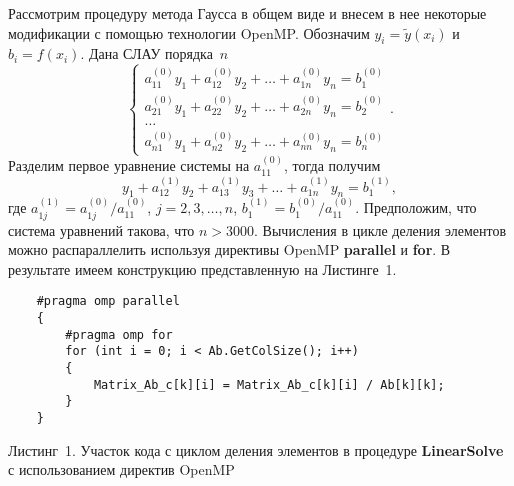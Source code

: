 \documentclass{spisok-article}
\begin{document}
Рассмотрим процедуру метода Гаусса в общем виде и внесем в нее некоторые модификации с помощью технологии OpenMP. Обозначим $y_i=\tilde y\left(x_i\right)$ и $b_i=f\left(x_i\right)$. Дана СЛАУ порядка~$n$
$$
	\begin{cases}
		a_{11}^{\left(0\right)}y_1+a_{12}^{\left(0\right)}y_2+\ldots+a_{1n}^{\left(0\right)}y_n=b_{1}^{\left(0\right)}\\
		a_{21}^{\left(0\right)}y_1+a_{22}^{\left(0\right)}y_2+\ldots+a_{2n}^{\left(0\right)}y_n=b_{2}^{\left(0\right)}\\
		\ldots\\
		a_{n1}^{\left(0\right)}y_1+a_{n2}^{\left(0\right)}y_2+\ldots+a_{nn}^{\left(0\right)}y_n=b_{n}^{\left(0\right)}
	\end{cases}.
$$
Разделим первое уравнение системы на $a_{11}^{\left(0\right)}$, тогда получим
\begin{equation}
	y_1+a_{12}^{\left(1\right)}y_2+a_{13}^{\left(1\right)}y_3+\ldots+a_{1n}^{\left(1\right)}y_n=b_1^{\left(1\right)},
	\label{f2}
\end{equation}
где $a_{1j}^{\left(1\right)}=a_{1j}^{\left(0\right)}/a_{11}^{\left(0\right)}$, $j=2,3,\ldots,n$, $b_1^{\left(1\right)}=b_{1}^{\left(0\right)}/a_{11}^{\left(0\right)}$. Предположим, что система уравнений такова, что $n>3000$. Вычисления в цикле деления элементов можно распараллелить используя директивы OpenMP \textbf{parallel} и \textbf{for}. В результате имеем конструкцию представленную на Листинге~1.
\vspace{2mm}
\begin{lstlisting}
	#pragma omp parallel 	
	{
		#pragma omp for
		for (int i = 0; i < Ab.GetColSize(); i++)
		{
			Matrix_Ab_c[k][i] = Matrix_Ab_c[k][i] / Ab[k][k];
		}
	}
\end{lstlisting}
\vspace{-3mm}
\begin{center}
	\small{Листинг~1. Участок кода с циклом деления элементов в процедуре \textbf{LinearSolve} с использованием директив OpenMP}
\end{center}
\end{document}

